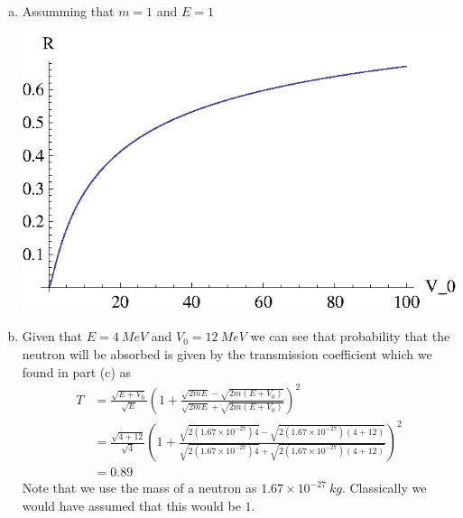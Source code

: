 \documentclass[11pt]{article}
\numberwithin{equation}{section}
\begin{document}
\begin{enumerate}[(a)]
\item Assumming that $m=1$ and $E=1$\\
\begin{center}
\includegraphics[scale=1.0]{Prob1.partd.eps}
\end{center}


\item
Given that $E=4\ MeV$ and $V_0 = 12\ MeV$ we can see that probability that the neutron will be absorbed is given by the transmission coefficient which we found in part (c) as
\begin{align*}
T &= \frac{\sqrt{E+V_0}}{\sqrt{E}}\left(1+\frac{\sqrt{2mE}-\sqrt{2m(E+V_0)}}{\sqrt{2mE}+\sqrt{2m(E+V_0)}}\right)^2\\
&= \frac{\sqrt{4+12}}{\sqrt{4}}\left(1+\frac{\sqrt{2(1.67\times10^{-27})4}-\sqrt{2(1.67\times10^{-27})(4+12)}}{\sqrt{2(1.67\times10^{-27})4}+\sqrt{2(1.67\times10^{-27})(4+12)}}\right)^2\\
&= 0.89
\end{align*}
Note that we use the mass of a neutron as $1.67\times10^{-27}\ kg$. Classically we would have assumed that this would be $1$.
\end{enumerate}
\end{document}
